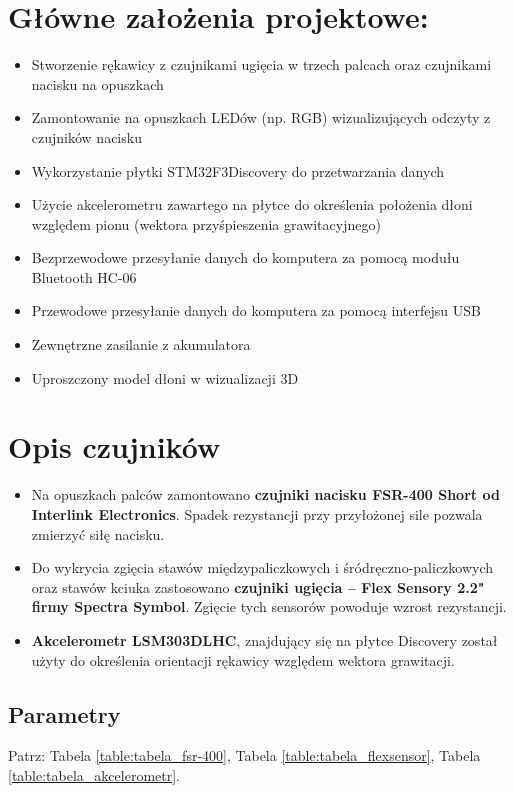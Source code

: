\documentclass[12pt,a4paper]{article}
\begin{document}
\maketitle
\tableofcontents
\newpage


\section{Główne założenia projektowe: }\normalsize
\begin{itemize}
\item Stworzenie rękawicy z czujnikami ugięcia w trzech palcach oraz czujnikami nacisku na opuszkach
\item Zamontowanie na opuszkach LEDów (np. RGB) wizualizujących odczyty z czujników nacisku
\item Wykorzystanie płytki STM32F3Discovery do przetwarzania danych
\item Użycie akcelerometru zawartego na płytce do określenia położenia dłoni względem pionu (wektora przyśpieszenia grawitacyjnego)
\item Bezprzewodowe przesyłanie danych do komputera za pomocą modułu Bluetooth HC-06
\item Przewodowe przesyłanie danych do komputera za pomocą interfejsu USB
\item Zewnętrzne zasilanie z akumulatora
\item Uproszczony model dłoni w wizualizacji 3D
\end{itemize}

\section{Opis czujników} \label{opis_czujnikow}
\begin{itemize}
\item Na opuszkach palców zamontowano \textbf{czujniki nacisku FSR-400 Short od Interlink Electronics}. Spadek rezystancji przy przyłożonej sile pozwala zmierzyć siłę nacisku.
\item Do wykrycia zgięcia stawów międzypaliczkowych i śródręczno-paliczkowych oraz stawów kciuka zastosowano \textbf{czujniki ugięcia -- Flex Sensory 2.2" firmy Spectra Symbol}. Zgięcie tych sensorów powoduje wzrost rezystancji.
\item \textbf{Akcelerometr LSM303DLHC}, znajdujący się na płytce Discovery został użyty do określenia orientacji rękawicy względem wektora grawitacji.
\end{itemize}
\subsection{Parametry}
Patrz: Tabela \ref{table:tabela_fsr-400}, Tabela \ref{table:tabela_flexsensor}, Tabela \ref{table:tabela_akcelerometr}.
\end{document}
